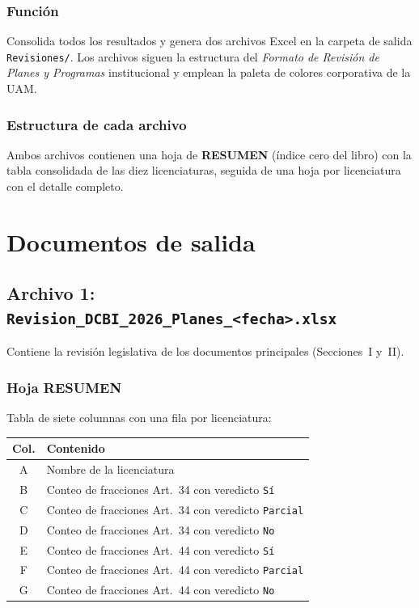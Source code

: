 \documentclass[11pt,a4paper]{article}
\begin{document}
\subsubsection{Función}

Consolida todos los resultados y genera dos archivos Excel en la carpeta de salida
\texttt{Revisiones/}. Los archivos siguen la estructura del \textit{Formato de Revisión
de Planes y Programas} institucional y emplean la paleta de colores corporativa de
la UAM.

\subsubsection{Estructura de cada archivo}

Ambos archivos contienen una hoja de \textbf{RESUMEN} (índice cero del libro)
con la tabla consolidada de las diez licenciaturas, seguida de una hoja por
licenciatura con el detalle completo.

\section{Documentos de salida}

\subsection{Archivo 1: \texttt{Revision\_DCBI\_2026\_Planes\_<fecha>.xlsx}}

Contiene la revisión legislativa de los documentos principales (Secciones~I y~II).

\subsubsection{Hoja RESUMEN}

Tabla de siete columnas con una fila por licenciatura:

\begin{center}
\begin{tabular}{cl}
\toprule
\textbf{Col.} & \textbf{Contenido} \\
\midrule
A & Nombre de la licenciatura \\
B & Conteo de fracciones Art.\ 34 con veredicto \texttt{Sí} \\
C & Conteo de fracciones Art.\ 34 con veredicto \texttt{Parcial} \\
D & Conteo de fracciones Art.\ 34 con veredicto \texttt{No} \\
E & Conteo de fracciones Art.\ 44 con veredicto \texttt{Sí} \\
F & Conteo de fracciones Art.\ 44 con veredicto \texttt{Parcial} \\
G & Conteo de fracciones Art.\ 44 con veredicto \texttt{No} \\
\bottomrule
\end{tabular}
\end{center}
\end{document}
